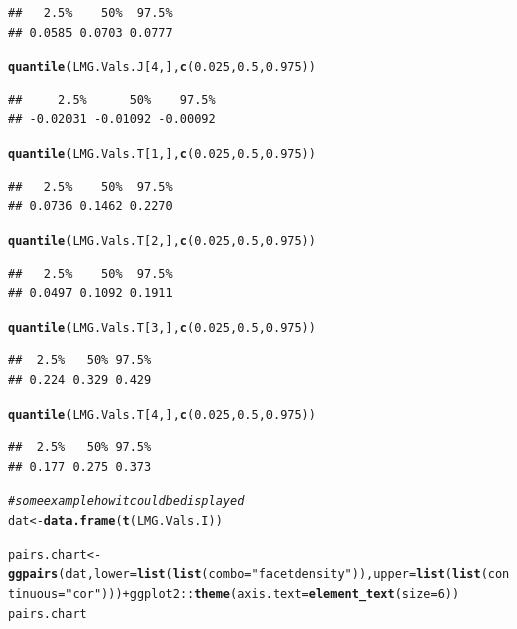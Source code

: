 \documentclass[11pt,a4paper,twoside]{book}\usepackage[]{graphicx}\usepackage[]{color}
\makeatletter
\newcommand{\hlnum}[1]{\textcolor[rgb]{0.686,0.059,0.569}{#1}}%
\newcommand{\hlstr}[1]{\textcolor[rgb]{0.192,0.494,0.8}{#1}}%
\newcommand{\hlcom}[1]{\textcolor[rgb]{0.678,0.584,0.686}{\textit{#1}}}%
\newcommand{\hlopt}[1]{\textcolor[rgb]{0,0,0}{#1}}%
\newcommand{\hlstd}[1]{\textcolor[rgb]{0.345,0.345,0.345}{#1}}%
\newcommand{\hlkwb}[1]{\textcolor[rgb]{0.69,0.353,0.396}{#1}}%
\newcommand{\hlkwc}[1]{\textcolor[rgb]{0.333,0.667,0.333}{#1}}%
\newcommand{\hlkwd}[1]{\textcolor[rgb]{0.737,0.353,0.396}{\textbf{#1}}}%
\newenvironment{kframe}{%
 \def\at@end@of@kframe{}%
 \ifinner\ifhmode%
  \def\at@end@of@kframe{\end{minipage}}%
  \begin{minipage}{\columnwidth}%
 \fi\fi%
 \def\FrameCommand##1{\hskip\@totalleftmargin \hskip-\fboxsep
 \colorbox{shadecolor}{##1}\hskip-\fboxsep
     \hskip-\linewidth \hskip-\@totalleftmargin \hskip\columnwidth}%
 \MakeFramed {\advance\hsize-\width
   \@totalleftmargin\z@ \linewidth\hsize
   \@setminipage}}%
 {\par\unskip\endMakeFramed%
 \at@end@of@kframe}
\newenvironment{knitrout}{}{} %
\makeatother
\begin{document}
\begin{knitrout}
\begin{kframe}
\begin{alltt}
\end{alltt}
\begin{verbatim}
##   2.5%    50%  97.5% 
## 0.0585 0.0703 0.0777
\end{verbatim}
\begin{alltt}
\hlkwd{quantile}\hlstd{(LMG.Vals.J[}\hlnum{4}\hlstd{,],} \hlkwd{c}\hlstd{(}\hlnum{0.025}\hlstd{,} \hlnum{0.5}\hlstd{,} \hlnum{0.975}\hlstd{))}
\end{alltt}
\begin{verbatim}
##     2.5%      50%    97.5% 
## -0.02031 -0.01092 -0.00092
\end{verbatim}
\begin{alltt}
\hlkwd{quantile}\hlstd{(LMG.Vals.T[}\hlnum{1}\hlstd{,],} \hlkwd{c}\hlstd{(}\hlnum{0.025}\hlstd{,} \hlnum{0.5}\hlstd{,} \hlnum{0.975}\hlstd{))}
\end{alltt}
\begin{verbatim}
##   2.5%    50%  97.5% 
## 0.0736 0.1462 0.2270
\end{verbatim}
\begin{alltt}
\hlkwd{quantile}\hlstd{(LMG.Vals.T[}\hlnum{2}\hlstd{,],} \hlkwd{c}\hlstd{(}\hlnum{0.025}\hlstd{,} \hlnum{0.5}\hlstd{,} \hlnum{0.975}\hlstd{))}
\end{alltt}
\begin{verbatim}
##   2.5%    50%  97.5% 
## 0.0497 0.1092 0.1911
\end{verbatim}
\begin{alltt}
\hlkwd{quantile}\hlstd{(LMG.Vals.T[}\hlnum{3}\hlstd{,],} \hlkwd{c}\hlstd{(}\hlnum{0.025}\hlstd{,} \hlnum{0.5}\hlstd{,} \hlnum{0.975}\hlstd{))}
\end{alltt}
\begin{verbatim}
##  2.5%   50% 97.5% 
## 0.224 0.329 0.429
\end{verbatim}
\begin{alltt}
\hlkwd{quantile}\hlstd{(LMG.Vals.T[}\hlnum{4}\hlstd{,],} \hlkwd{c}\hlstd{(}\hlnum{0.025}\hlstd{,} \hlnum{0.5}\hlstd{,} \hlnum{0.975}\hlstd{))}
\end{alltt}
\begin{verbatim}
##  2.5%   50% 97.5% 
## 0.177 0.275 0.373
\end{verbatim}
\begin{alltt}
\hlcom{# some example how it could be displayed}
\hlstd{dat} \hlkwb{<-} \hlkwd{data.frame}\hlstd{(}\hlkwd{t}\hlstd{(LMG.Vals.I))}

\hlstd{pairs.chart} \hlkwb{<-} \hlkwd{ggpairs}\hlstd{(dat,} \hlkwc{lower} \hlstd{=} \hlkwd{list}\hlstd{(}\hlkwd{list}\hlstd{(}\hlkwc{combo} \hlstd{=} \hlstr{"facetdensity"}\hlstd{)),} \hlkwc{upper} \hlstd{=} \hlkwd{list}\hlstd{(}\hlkwd{list}\hlstd{(}\hlkwc{continuous} \hlstd{=} \hlstr{"cor"}\hlstd{)))} \hlopt{+} \hlstd{ggplot2}\hlopt{::}\hlkwd{theme}\hlstd{(}\hlkwc{axis.text} \hlstd{=} \hlkwd{element_text}\hlstd{(}\hlkwc{size} \hlstd{=} \hlnum{6}\hlstd{))}
\hlstd{pairs.chart}
\end{alltt}
\end{kframe}


\end{knitrout}
\end{document}
